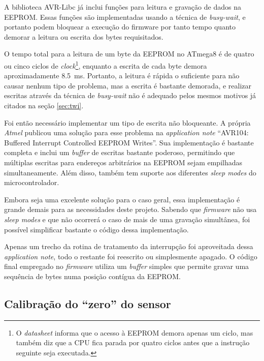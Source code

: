 \documentclass[brazil,pagestart=firstchapter]{abnt}
\begin{document}
A biblioteca AVR-Libc já inclui funções para leitura e gravação de dados na
\ac{EEPROM}. Essas funções são implementadas usando a técnica de
\textit{busy-wait}, e portanto podem bloquear a execução do firmware por
tanto tempo quanto demorar a leitura ou escrita dos bytes requisitados.
\cite{avrlibceeprom}

O tempo total para a leitura de um byte da \ac{EEPROM} no ATmega8 é de
quatro ou cinco ciclos de \textit{clock}\footnote{
	O \textit{datasheet} informa que o acesso à \ac{EEPROM} demora apenas
	um ciclo, mas também diz que a CPU fica parada por quatro ciclos antes
	que a instrução seguinte seja executada.
}, enquanto a escrita de cada byte demora aproximadamente
\SI{8.5}{\milli\second}. \cite[p.~21]{ATmega8} Portanto, a leitura é rápida
o suficiente para não causar nenhum tipo de problema, mas a escrita
é bastante demorada, e realizar escritas através da técnica de
\textit{busy-wait} não é adequado pelos mesmos motivos já citados na seção
\ref{sec:twi}.

Foi então necessário implementar um tipo de escrita não bloqueante.
A própria \textit{Atmel} publicou uma solução para esse problema na
\textit{application note} ``AVR104: Buffered Interrupt Controlled EEPROM
Writes''. \cite{AVR104} Sua implementação é bastante completa e inclui um
\textit{buffer} de escritas bastante poderoso, permitindo que múltiplas
escritas para endereços arbitrários na \ac{EEPROM} sejam empilhadas
simultaneamente. Além disso, também tem suporte aos diferentes \textit{sleep
modes} do microcontrolador. \cite[p.~33]{ATmega8}

Embora seja uma excelente solução para o caso geral, essa implementação
é grande demais para as necessidades deste projeto.
Sabendo que \textit{firmware} não usa \textit{sleep modes} e que não
ocorrerá o caso de mais de uma gravação simultânea, foi possível simplificar
bastante o código dessa implementação.

Apenas um trecho da rotina de tratamento da interrupção foi aproveitada
dessa \textit{application note}, todo o restante foi reescrito ou
simplesmente apagado.  O código final empregado no \textit{firmware} utiliza
um \textit{buffer} simples que permite gravar uma sequência de bytes numa
posição contígua da \ac{EEPROM}.


\subsection{Calibração do ``zero'' do sensor}
\label{sub:zerocal}
\end{document}
